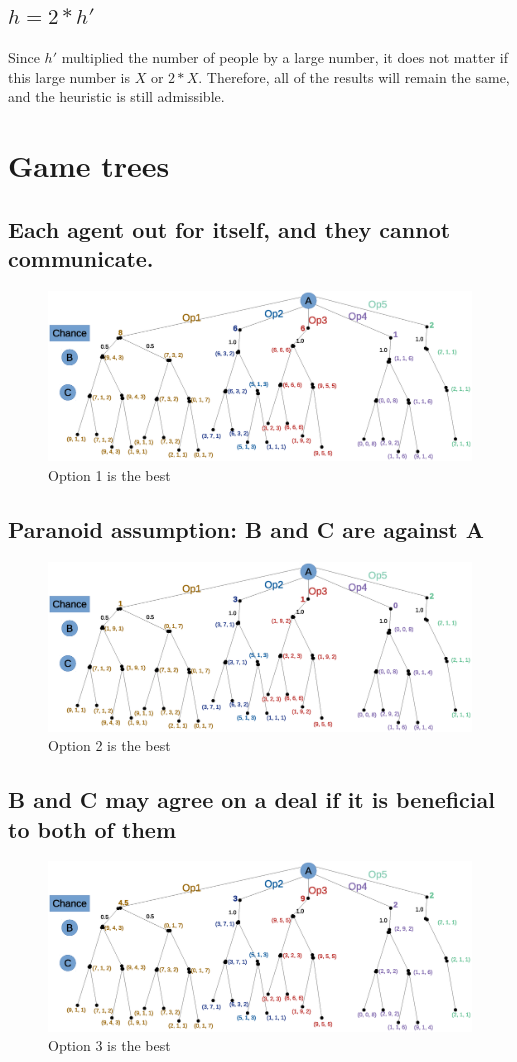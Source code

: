 \documentclass{article}                     %
\begin{document}
	\subsection{$ h=2 * h' $}
	Since $ h' $ multiplied the number of people by a large number, it does not matter if this large number is $ X $ or $ 2*X $. Therefore, all of the results will remain the same, and the heuristic is still admissible.
	
	\section{Game trees}
	\subsection{Each agent out for itself, and they cannot communicate.}
	\begin{figure}[H]
		\centering
		\includegraphics[width=0.7\linewidth]{q3_1.eps}
		\caption{Option 1 is the best}
		\label{fig:q31}
	\end{figure}
	
	\subsection{Paranoid assumption: B and C are against A}
	\begin{figure}[H]
		\centering
		\includegraphics[width=0.7\linewidth]{q3_2.eps}
		\caption{Option 2 is the best}
		\label{fig:q31}
	\end{figure}

	\subsection{B and C may agree on a deal if it is beneficial to both of them}
	\begin{figure}[H]
		\centering
		\includegraphics[width=0.7\linewidth]{q3_3.eps}
		\caption{Option 3 is the best}
		\label{fig:q31}
	\end{figure}
\end{document}

